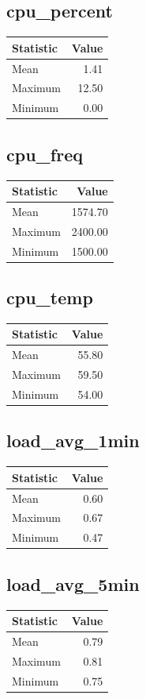 \documentclass[11pt]{article}
\begin{document}
\subsection{cpu_percent}
\begin{tabular}{lr}
\toprule
Statistic & Value \\
\midrule
Mean & 1.41 \\
Maximum & 12.50 \\
Minimum & 0.00 \\
\bottomrule
\end{tabular}


\subsection{cpu_freq}
\begin{tabular}{lr}
\toprule
Statistic & Value \\
\midrule
Mean & 1574.70 \\
Maximum & 2400.00 \\
Minimum & 1500.00 \\
\bottomrule
\end{tabular}


\subsection{cpu_temp}
\begin{tabular}{lr}
\toprule
Statistic & Value \\
\midrule
Mean & 55.80 \\
Maximum & 59.50 \\
Minimum & 54.00 \\
\bottomrule
\end{tabular}


\subsection{load_avg_1min}
\begin{tabular}{lr}
\toprule
Statistic & Value \\
\midrule
Mean & 0.60 \\
Maximum & 0.67 \\
Minimum & 0.47 \\
\bottomrule
\end{tabular}


\subsection{load_avg_5min}
\begin{tabular}{lr}
\toprule
Statistic & Value \\
\midrule
Mean & 0.79 \\
Maximum & 0.81 \\
Minimum & 0.75 \\
\bottomrule
\end{tabular}
\end{document}
